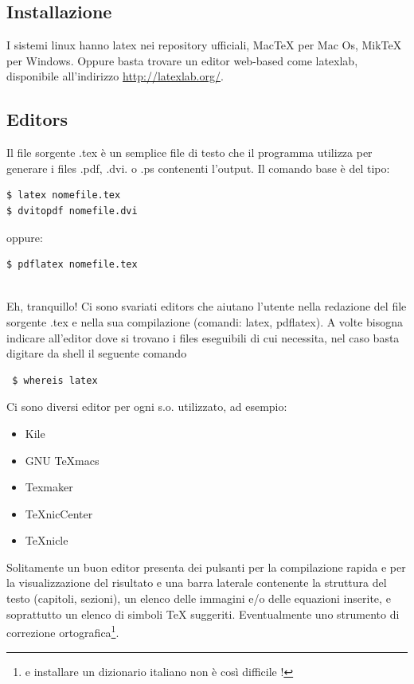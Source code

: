 \documentclass[12pt,a4paper]{article}
\newcommand{\scatola}[1]{\fbox{\begin{minipage}{\textwidth} #1 \end{minipage}}\vspace*{.5cm} }
\begin{document}
\subsection{Installazione}
I sistemi linux hanno latex nei repository ufficiali, MacTeX per Mac Os, MikTeX per Windows. Oppure basta trovare un editor web-based come latexlab, disponibile all'indirizzo \href{http://latexlab.org/}{http://latexlab.org/}.
\subsection{Editors}
Il file sorgente .tex \`e un semplice file di testo che il programma utilizza per generare i files .pdf, .dvi. o .ps contenenti l'output. Il comando base \`e del tipo:
\begin{verbatim}
$ latex nomefile.tex
$ dvitopdf nomefile.dvi
\end{verbatim}
oppure:
\begin{verbatim}
$ pdflatex nomefile.tex
\end{verbatim}
\scatola{Gi\`a qui mi sembra complicato....}\\
Eh, tranquillo! Ci sono svariati editors che aiutano l'utente nella redazione del file sorgente .tex e nella sua compilazione (comandi: latex, pdflatex). A volte bisogna indicare all'editor dove si trovano i files eseguibili di cui necessita, nel caso basta digitare da shell il seguente comando\\
\begin{verbatim}
 $ whereis latex
\end{verbatim}

Ci sono diversi editor per ogni s.o. utilizzato, ad esempio:
\begin{itemize}
 \item Kile  \item GNU TeXmacs  \item Texmaker \item TeXnicCenter \item TeXnicle
\end{itemize}
Solitamente un buon editor presenta dei pulsanti per la compilazione rapida e per la visualizzazione del risultato e una barra laterale contenente la struttura del testo (capitoli, sezioni), un elenco delle immagini e/o delle equazioni inserite, e soprattutto un elenco di simboli \TeX{} suggeriti. Eventualmente uno strumento di correzione ortografica\footnote{e installare un dizionario italiano non \`e cos\`i difficile !}.
\end{document}
